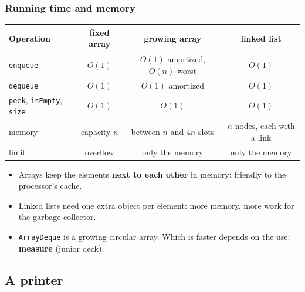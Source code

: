 \documentclass[aspectratio=169,10pt,compress]{beamer}
\begin{document}
\begin{frame}[t,fragile] \frametitle{Running time and memory}
  \begin{center}\footnotesize
  \begin{tabular}{@{}lccc@{}}
    \toprule
    \textbf{Operation} & \textbf{fixed array} & \textbf{growing array} & \textbf{linked list} \\
    \midrule
    \texttt{enqueue}   & $O(1)$                        & $O(1)$ amortized, $O(n)$ worst & $O(1)$ \\
    \texttt{dequeue}   & $O(1)$                        & $O(1)$ amortized               & $O(1)$ \\
    \texttt{peek}, \texttt{isEmpty}, \texttt{size} & $O(1)$ & $O(1)$              & $O(1)$ \\
    memory             & capacity $n$                  & between $n$ and $4n$ slots     & $n$ nodes, each with a link \\
    limit              & overflow                      & only the memory                & only the memory \\
    \bottomrule
  \end{tabular}
  \end{center}
  \vspace{0.4em}
  \begin{itemize}\small
    \item Arrays keep the elements \textbf{next to each other} in memory: friendly to the processor's cache.
    \item Linked lists need one extra object per element: more memory, more work for the garbage collector.
    \item \texttt{ArrayDeque} is a growing circular array. Which is faster depends on the use: \textbf{measure} (junior deck).
  \end{itemize}
\end{frame}


\subsection[Printer]{A printer}
\end{document}
